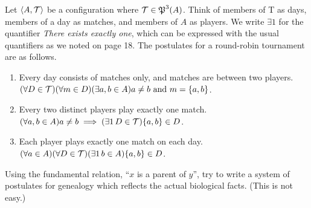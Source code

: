 \begin{solution}
Let $\left\langle A,\mathcal{T}\right\rangle$ be a configuration where $\mathcal{T} \in \operatorname{\mathfrak{P}}^3(A)$. Think of members of T as days,
members of a day as matches, and members of $A$ as players. We write $\exists 1$ for the quantifier
\textit{There exists exactly one}, which can be expressed with the usual quantifiers as we noted
on page 18. The postulates for a round-robin tournament are as follows.
\begin{enumerate}[label=(\roman*)]
    \item Every day consists of matches only, and matches are between two players.\\
        $(\forall D\in\mathcal{T})(\forall m\in D)(\exists a,b\in A)a\neq b\text{ and } m=\left\{a,b\right\}$.
    \item Every two distinct players play exactly one match.\\
        $(\forall a,b\in A)a\neq b\implies(\exists 1\thinspace D\in\mc T)\set{a,b}\in D$.
    \item Each player plays exactly one match on each day.\\
        $(\forall a\in A)(\forall D\in\mc T)(\exists 1\thinspace b\in A)\set{a,b}\in D$.
\end{enumerate}
\end{solution}

\begin{exercise}
Using the fundamental relation, ``$x$ is a parent of $y$'', try to write a system of
postulates for genealogy which reflects the actual biological facts. (This is not easy.)
\end{exercise}

